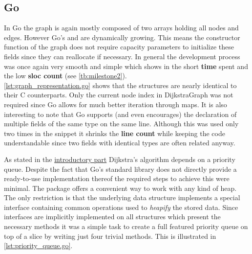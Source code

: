 \subsection{Go}
\label{subsec:Implementation::Graph_Representation::Go}

In Go the graph is again mostly composed of two arrays holding all nodes and edges. However Go's  and  are dynamically growing. This means the constructor function of the graph does not require capacity parameters to initialize these fields since they can reallocate if necessary. In general the development process was once again very smooth and simple which shows in the short \textbf{time} spent and the low \textbf{\gls{sloc} count} (see \autoref{tb:milestone2}).
\\


\autoref{lst:graph_representation.go} shows that the structures are nearly identical to their C counterparts. Only the current node index in DijkstraGraph was not required since Go allows for much better iteration through maps. It is also interesting to note that Go supports (and even encourages) the declaration of multiple fields of the same type on the same line. Although this was used only two times in the snippet it shrinks the \textbf{line count} while keeping the code understandable since two fields with identical types are often related anyway.

As stated in the \hyperref[sec:Implementation::Graph_Representation]{introductory part} Dijkstra's algorithm depends on a priority queue. Despite the fact that Go's standard library does not directly provide a ready-to-use implementation thereof the required steps to achieve this were minimal. The package  offers a convenient way to work with any kind of heap. The only restriction is that the underlying data structure implements a special interface containing common operations used to \textit{heapify} the stored data. Since interfaces are implicitly implemented on all structures which present the necessary methods it was a simple task to create a full featured priority queue on top of a slice by writing just four trivial methods. This is illustrated in \autoref{lst:priority_queue.go}.
\\


